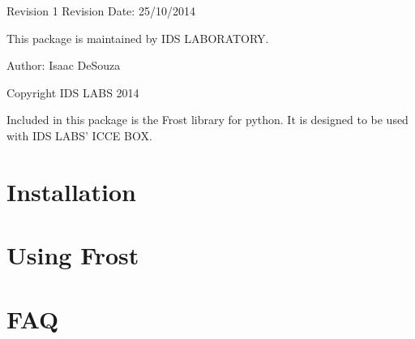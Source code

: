 Revision 1 Revision Date\+: 25/10/2014

This package is maintained by I\+D\+S L\+A\+B\+O\+R\+A\+T\+O\+R\+Y.

Author\+: Isaac De\+Souza

Copyright I\+D\+S L\+A\+B\+S 2014

Included in this package is the Frost library for python. It is designed to be used with I\+D\+S L\+A\+B\+S' I\+C\+C\+E B\+O\+X.

\section*{Installation }

\section*{Using Frost }

\section*{F\+A\+Q }